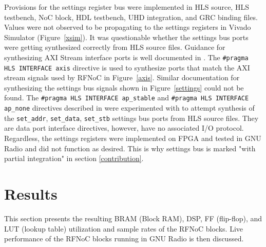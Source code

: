 \documentclass{article}
\begin{document}
Provisions for the settings register bus were implemented in HLS source, HLS testbench, NoC block, HDL testbench, UHD integration, and GRC binding files. Values were not observed to be propagating to the settings registers in Vivado Simulator (Figure~\ref{xsim}). It was questionable whether the settings bus ports were getting synthesized correctly from HLS source files. Guidance for synthesizing AXI Stream interface ports is well documented in \cite{ug1037}. The {\tt \#pragma HLS INTERFACE axis} directive is used to synthesize ports that match the AXI stream signals used by RFNoC in Figure~\ref{axis}. Similar documentation for synthesizing the settings bus signals shown in Figure~\ref{settings} could not be found. The {\tt \#pragma HLS INTERFACE ap\_stable} and {\tt \#pragma HLS INTERFACE ap\_none} directives described in \cite{ug902} were experimented with to attempt synthesis of the {\tt set\_addr}, {\tt set\_data}, {\tt set\_stb} settings bus ports from HLS source files. They are data port interface directives, however, have no associated I/O protocol. Regardless, the settings registers were implemented on FPGA and tested in GNU Radio and did not function as desired. This is why settings bus is marked "with partial integration" in section \ref{contribution}.

\section{Results} \label{results}

This section presents the resulting BRAM (Block RAM), DSP, FF (flip-flop), and LUT (lookup table) utilization and sample rates of the RFNoC blocks. Live performance of the RFNoC blocks running in GNU Radio is then discussed.
\end{document}
